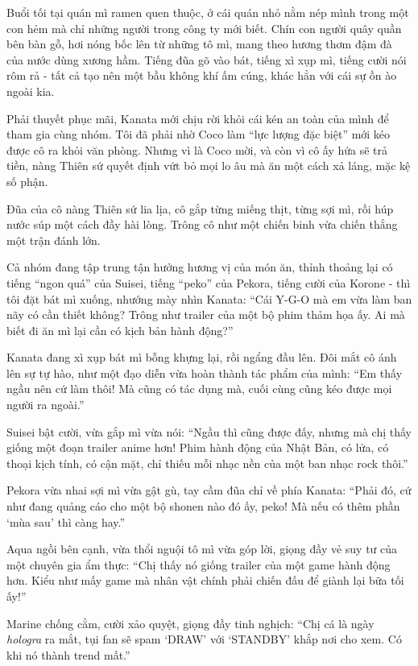 \documentclass[../main.tex]{subfiles}
\begin{document}

Buổi tối tại quán mì ramen quen thuộc, ở cái quán nhỏ nằm nép mình trong một con hẻm mà chỉ những người trong công ty mới biết. Chín con người quây quần bên bàn gỗ, hơi nóng bốc lên từ những tô mì, mang theo hương thơm đậm đà của nước dùng xương hầm. Tiếng đũa gõ vào bát, tiếng xì xụp mì, tiếng cười nói rôm rả - tất cả tạo nên một bầu không khí ấm cúng, khác hẳn với cái sự ồn ào ngoài kia.

Phải thuyết phục mãi, Kanata mới chịu rời khỏi cái kén an toàn của mình để tham gia cùng nhóm. Tôi đã phải nhờ Coco làm ``lực lượng đặc biệt'' mới kéo được cô ra khỏi văn phòng. Nhưng vì là Coco mời, và còn vì cô ấy hứa sẽ trả tiền, nàng Thiên sứ quyết định vứt bỏ mọi lo âu mà ăn một cách xả láng, mặc kệ số phận.

Đũa của cô nàng Thiên sứ lia lịa, cô gắp từng miếng thịt, từng sợi mì, rồi húp nước súp một cách đầy hài lòng. Trông cô như một chiến binh vừa chiến thắng một trận đánh lớn.

Cả nhóm đang tập trung tận hưởng hương vị của món ăn, thỉnh thoảng lại có tiếng ``ngon quá'' của Suisei, tiếng ``peko'' của Pekora, tiếng cười của Korone - thì tôi đặt bát mì xuống, nhướng mày nhìn Kanata: ``Cái Y-G-O mà em vừa làm ban nãy có cần thiết không? Trông như trailer của một bộ phim thảm họa ấy. Ai mà biết đi ăn mì lại cần có kịch bản hành động?''

Kanata đang xì xụp bát mì bỗng khựng lại, rồi ngẩng đầu lên. Đôi mắt cô ánh lên sự tự hào, như một đạo diễn vừa hoàn thành tác phẩm của mình: ``Em thấy ngầu nên cứ làm thôi! Mà cũng có tác dụng mà, cuối cùng cũng kéo được mọi người ra ngoài.''

Suisei bật cười, vừa gắp mì vừa nói: ``Ngầu thì cũng được đấy, nhưng mà chị thấy giống một đoạn trailer anime hơn! Phim hành động của Nhật Bản, có lửa, có thoại kịch tính, có cận mặt, chỉ thiếu mỗi nhạc nền của một ban nhạc rock thôi.''

Pekora vừa nhai sợi mì vừa gật gù, tay cầm đũa chỉ về phía Kanata: ``Phải đó, cứ như đang quảng cáo cho một bộ shonen nào đó ấy, peko! Mà nếu có thêm phần `mùa sau' thì càng hay.''

Aqua ngồi bên cạnh, vừa thổi nguội tô mì vừa góp lời, giọng đầy vẻ suy tư của một chuyên gia ẩm thực: ``Chị thấy nó giống trailer của một game hành động hơn. Kiểu như mấy game mà nhân vật chính phải chiến đấu để giành lại bữa tối ấy!''

Marine chống cằm, cười xảo quyệt, giọng đầy tinh nghịch: ``Chị cá là ngày \textit{hologra} ra mắt, tụi fan sẽ spam `DRAW' với `STANDBY' khắp nơi cho xem. Có khi nó thành trend mất.''
\end{document}
